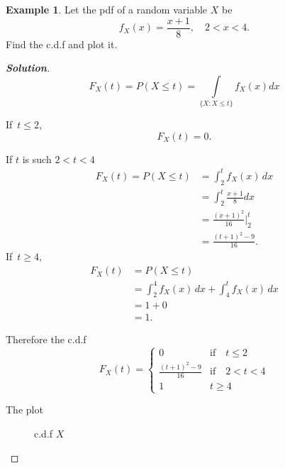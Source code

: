 \documentclass[12pt,a4paper]{report}
\theoremstyle{definition}
\newtheorem{example}[thm]{Example}
\theoremstyle{plain}
\theoremstyle{definition}
\begin{document}
\begin{example}
Let the pdf of a random variable $X$ be \[f_X(x)=\frac{x+1}{8},\quad 2<x<4.\]
Find the c.d.f and plot it.
\end{example}
\begin{proof}[\textbf{\textit{Solution}}]
\[F_X(t)=P(X\leq t)=\displaystyle{\int\limits_{\{X:X\leq t\}}}f_X(x)dx\]

If $\, t \leq 2$, \[F_X(t)=0.\]

If $t$ is such $2<t<4$
\begin{align*}
F_X(t)=P(X\leq t) & = \int^t_2f_X(x)\, dx\\
& =\int^t_2\frac{x+1}{8}dx\\
& = \frac{(x+1)^2}{16}\Big|^t_2\\
& = \frac{(t+1)^2-9}{16}.
\end{align*}
If $\, t\geq 4$,
\begin{align*}
F_X(t) & = P(X\leq t)\\
& = \int^4_2f_X(x)\, dx+\int^t_4f_X(x)\,dx\\
& = 1+0\\
& = 1.
\end{align*}


Therefore the c.d.f
\[F_X(t)=
\begin{cases}
0 & \text{if}\quad  t\leq 2\\
\frac{(t+1)^2-9}{16} & \text{if}\quad  2<t<4\\
1 & t\geq 4
\end{cases}
\]

The plot
\begin{figure}[H]
\centering
{}
\caption{c.d.f $X$}
\end{figure}
\end{proof}
\end{document}

